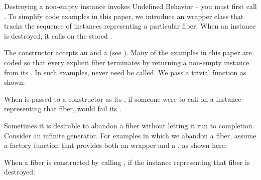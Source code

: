 \label{launch}

Destroying a non-empty \fiber instance invokes Undefined Behavior -- you must
first call \anycancel. To simplify code examples in this paper, we introduce
an  wrapper class that tracks the sequence of \fiber instances
representing a particular fiber. When an  instance is
destroyed, it calls \cancel on the stored \fiber.


The \fiber constructor accepts an \entryfn and a \cancelfn (see
). Many of the examples in this paper are coded so that
every explicit fiber terminates by returning a non-empty \fiber instance from
its \entryfn. In such examples, \cancel never need be called. We pass a
trivial  function as shown:


When  is passed to a \fiber constructor as its \cancelfn,
if someone were to call \cancel on a \fiber instance representing that fiber,
 would fail its .

Sometimes it is desirable to abandon a fiber without letting it run to
completion. Consider an infinite generator. For examples in which we abandon a
fiber, assume a  factory function that provides both an \entryfn
wrapper and a \cancelfn, as shown here:


When a fiber is constructed by calling , if the 
instance representing that fiber is destroyed:

